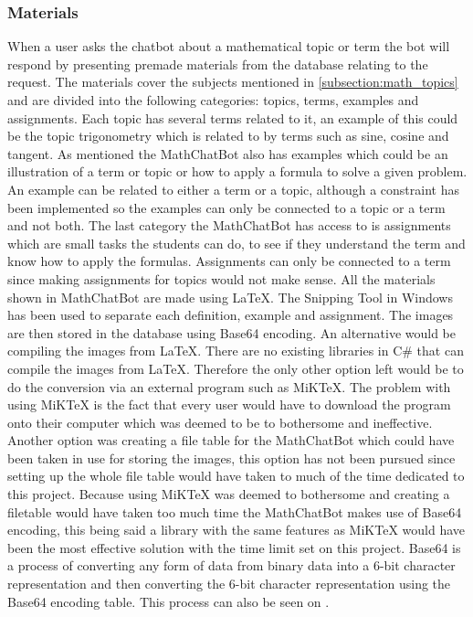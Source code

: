 \subsubsection{Materials}
When a user asks the chatbot about a mathematical topic or term the bot will respond by presenting premade materials from the database relating to the request. The materials cover the subjects mentioned in \ref{subsection:math_topics} and are divided into the following categories: topics, terms, examples and assignments. Each topic has several terms related to it, an example of this could be the topic trigonometry which is related to by terms such as sine, cosine and tangent. As mentioned the MathChatBot also has examples which could be an illustration of a term or topic or how to apply a formula to solve a given problem. An example can be related to either a term or a topic, although a constraint has been implemented so the examples can only be connected to a topic or a term and not both. The last category the MathChatBot has access to is assignments which are small tasks the students can do, to see if they understand the term and know how to apply the formulas. Assignments can only be connected to a term since making assignments for topics would not make sense.
\newline\newline
All the materials shown in MathChatBot are made using LaTeX. The Snipping Tool in Windows has been used to separate each definition, example and assignment. The images are then stored in the database using Base64 encoding. An alternative would be compiling the images from LaTeX. There are no existing libraries in C\# that can compile the images from LaTeX. Therefore the only other option left would be to do the conversion via an external program such as MiKTeX. The problem with using MiKTeX is the fact that every user would have to download the program onto their computer which was deemed to be to bothersome and ineffective. Another option was creating a file table for the MathChatBot which could have been taken in use for storing the images, this option has not been pursued since setting up the whole file table would have taken to much of the time dedicated to this project. Because using MiKTeX was deemed to bothersome and creating a filetable would have taken too much time the MathChatBot makes use of Base64 encoding, this being said a library with the same features as MiKTeX would have been the most effective solution with the time limit set on this project. 
\newline\newline
Base64 is a process of converting any form of data from binary data into a 6-bit character representation and then converting the 6-bit character representation using the Base64 encoding table. This process can also be seen on .


